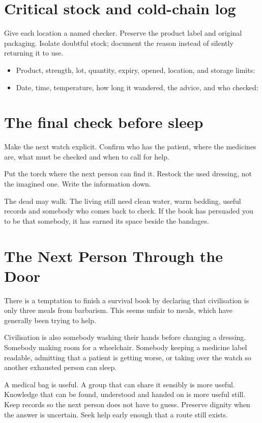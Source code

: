 \documentclass[10pt,openright]{book}
\begin{document}
\section*{Critical stock and cold-chain log}
Give each location a named checker. Preserve the product label and original packaging. Isolate doubtful stock; document the reason instead of silently returning it to use.

\begin{itemize}
\item Product, strength, lot, quantity, expiry, opened, location, and storage limits:
\item Date, time, temperature, how long it wandered, the advice, and who checked:
\end{itemize}
\section*{The final check before sleep}
Make the next watch explicit. Confirm who has the patient, where the medicines are, what must be checked and when to call for help.

Put the torch where the next person can find it. Restock the used dressing, not the imagined one. Write the information down.

The dead may walk. The living still need clean water, warm bedding, useful records and somebody who comes back to check. If the book has persuaded you to be that somebody, it has earned its space beside the bandages.

\section*{The Next Person Through the Door}
There is a temptation to finish a survival book by declaring that civilisation is only three meals from barbarism. This seems unfair to meals, which have generally been trying to help.

Civilisation is also somebody washing their hands before changing a dressing. Somebody making room for a wheelchair. Somebody keeping a medicine label readable, admitting that a patient is getting worse, or taking over the watch so another exhausted person can sleep.

A medical bag is useful. A group that can share it sensibly is more useful. Knowledge that can be found, understood and handed on is more useful still. Keep records so the next person does not have to guess. Preserve dignity when the answer is uncertain. Seek help early enough that a route still exists.
\end{document}
